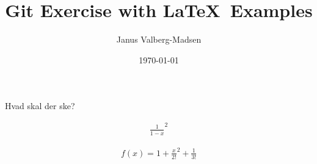 \documentclass[10pt,a4paper]{article}
\title{Git Exercise with \LaTeX\ Examples}
\author{Janus Valberg-Madsen}
\date{\today}
\begin{document}
\maketitle
Hvad skal der ske?

\begin{align}
\frac{1}{1-x}^2
\end{align}

\begin{align}
f(x)=1+\frac{x}{2!}^2+\frac{1}{3!}
\end{align}
\begin{abstract}
  
\end{abstract}

\tableofcontents



\end{document}
